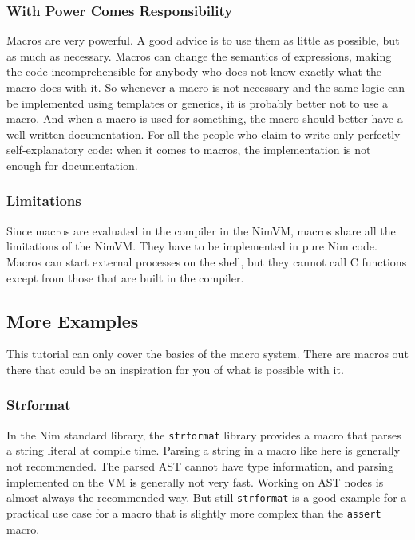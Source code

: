 \begin{verbatim}
\end{verbatim}

\hypertarget{with-power-comes-responsibility}{%
\subsubsection{With Power Comes
Responsibility}\label{with-power-comes-responsibility}}

Macros are very powerful. A good advice is to use them as little as
possible, but as much as necessary. Macros can change the semantics of
expressions, making the code incomprehensible for anybody who does not
know exactly what the macro does with it. So whenever a macro is not
necessary and the same logic can be implemented using templates or
generics, it is probably better not to use a macro. And when a macro is
used for something, the macro should better have a well written
documentation. For all the people who claim to write only perfectly
self-explanatory code: when it comes to macros, the implementation is
not enough for documentation.

\hypertarget{limitations}{%
\subsubsection{Limitations}\label{limitations}}

Since macros are evaluated in the compiler in the NimVM, macros share
all the limitations of the NimVM. They have to be implemented in pure
Nim code. Macros can start external processes on the shell, but they
cannot call C functions except from those that are built in the
compiler.

\hypertarget{more-examples}{%
\subsection{More Examples}\label{more-examples}}

This tutorial can only cover the basics of the macro system. There are
macros out there that could be an inspiration for you of what is
possible with it.

\hypertarget{strformat}{%
\subsubsection{Strformat}\label{strformat}}

In the Nim standard library, the \texttt{strformat} library provides a
macro that parses a string literal at compile time. Parsing a string in
a macro like here is generally not recommended. The parsed AST cannot
have type information, and parsing implemented on the VM is generally
not very fast. Working on AST nodes is almost always the recommended
way. But still \texttt{strformat} is a good example for a practical use
case for a macro that is slightly more complex than the \texttt{assert}
macro.

